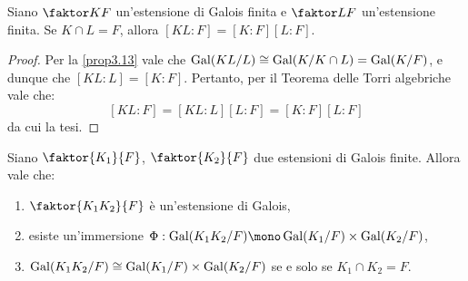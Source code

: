 \documentclass[11pt]{scrartcl}
\begin{document}
	\begin{corollary}
		\label{cor:3.14}
		Siano $\faktor K F$ un'estensione di Galois finita e $\faktor L F$ un'estensione finita. Se $K\cap L = F$, allora $[KL:F] = [K:F][L:F]$.
	\end{corollary}
	
	\begin{proof}
		Per la \autoref{prop3.13} vale che $\operatorname{Gal}(KL/L) \cong \operatorname{Gal}(K/K \cap L) =
		\operatorname{Gal}(K/F)$, e dunque che $[KL : L] = [K : F]$. Pertanto, per il Teorema
		delle Torri algebriche vale che:
		\[ [KL : F] = [KL : L] [L : F] = [K : F] [L : F] \]
		da cui la tesi.
	\end{proof}
	
	\begin{proposition}
		\label{prop3.15}
		Siano $\faktor{K_1}{F}$, $\faktor{K_2}{F}$ due estensioni di Galois finite. 
		Allora vale che:
		\begin{enumerate}[(1)]
			\item $\faktor{K_1K_2}{F}$ è un'estensione di Galois,
			\item esiste un'immersione $\Phi: \Gal(K_1K_2/F) \mono 
			\Gal(K_1/F)\times\Gal(K_2/F)$,
			\item $\operatorname{Gal}(K_1K_2/F)\cong \operatorname{Gal}(K_1/F)\times\operatorname{Gal}(K_2/F)$ se e solo 
			se $K_1\cap K_2 = F$. 
		\end{enumerate}
	\end{proposition}
	
\end{document}
